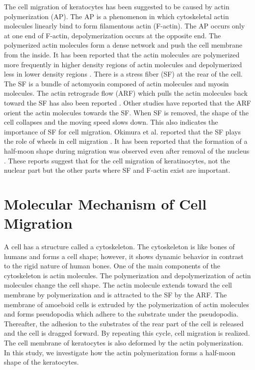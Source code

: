 \documentclass[a4paper,12pt, oneside]{book}
\begin{document}
The cell migration of keratocytes has been suggested to be caused by actin polymerization (AP)\cite{svitkina1997analysis}.
The AP is a phenomenon in which cytoskeletal actin molecules linearly bind to form filamentous actin (F-actin).
The AP occurs only at one end of F-actin, depolymerization occurs at the opposite end.
The polymerized actin molecules form a dense network and push the cell membrane from the inside.
It has been reported that the actin molecules are polymerized more frequently in higher density regions of actin molecules and depolymerized less in lower density regions \cite{yumura1998spatiotemporal}.
There is a stress fiber (SF) at the rear of the cell.
The SF is a bundle of actomyosin composed of actin molecules and myosin molecules.
The actin retrograde flow (ARF) which pulls the actin molecules back toward the SF has also been reported \cite{swaminathan2017actin}.
Other studies have reported that the ARF  orient the actin molecules towards the SF\cite{nakata2016role}.
When SF is removed, the shape of the cell collapses and the moving speed slows down.
This also indicates the importance of SF for cell migration.
Okimura et al. reported that the SF plays the role of wheels in cell migration \cite{okimura2018rotation}.
It has been reported that the formation of a half-moon shape during migration was observed even after removal of the nucleus \cite{asano2004keratocyte}.
These reports suggest that for the cell migration of keratinocytes, not the nuclear part but the other parts where SF and F-actin exist are important.

\section{Molecular Mechanism of Cell Migration}
A cell has a structure called a cytoskeleton.
The cytoskeleton is like bones of humans and forms a cell shape; however, it shows dynamic behavior  in contrast to the rigid nature of human bones.
One of the  main components of the cytoskeleton is actin molecules.
The polymerization and depolymerization of actin molecules change the cell shape.
The actin molecule extends toward the cell membrane by polymerization and is attracted to the SF by the ARF.
The membrane of amoeboid cells is extruded by the polymerization of actin molecules and forms pseudopodia which adhere to the substrate under the pseudopodia.
Thereafter, the adhesion to the substrates of the rear part of the cell is released and the cell is dragged forward.
By repeating this cycle, cell migration is realized.
The cell membrane of keratocytes is also deformed by the actin polymerization.
In this study, we investigate how the actin polymerization forms a half-moon shape of the keratocytes. 
\end{document}
